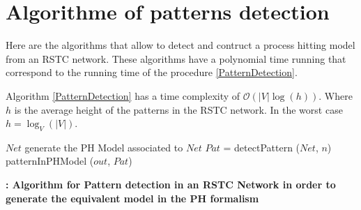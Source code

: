 \appendix
 \section{Algorithme of patterns detection}

 Here are the algorithms that allow to detect and contruct a process hitting model from an RSTC network.
 These algorithms have a polynomial time running that correspond to the running time of the procedure \ref{PatternDetection}.
 
 \begin{proposition}
  Algorithm \ref{PatternDetection} has a time complexity of $\mathcal{O}(|V|\log{}(h))$. 
  Where $h$ is the average height of the patterns in the RSTC network. In the worst case 
  $h = \log_{V}(|V|)$.
 \end{proposition}

 
 
 

\begin{algorithm}
\begin{algorithmic}[1]
\REQUIRE $Net$ 
\ENSURE generate the PH Model associated to $Net$
\STATE $Pat$ = detectPattern ($Net$, $n$)
\STATE patternInPHModel ($out$, $Pat$)

\ENDFOR
\end{algorithmic}
\caption{\bf: Algorithm for Pattern detection in an RSTC Network in order to generate the equivalent model in the PH formalism}
\label{automaticGenerationOfPHModel}
\end{algorithm}



